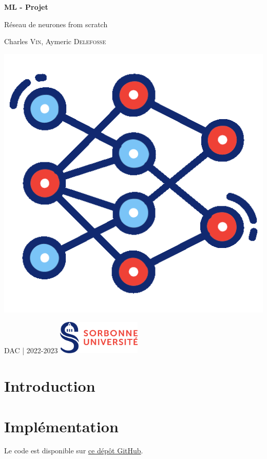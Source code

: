 \documentclass{article}
\begin{document}
\begin{titlepage}
    \begin{center}
        \vspace*{1cm}

        \Huge
        \textbf{ML - Projet}

        \LARGE
        Réseau de neurones from scratch

        \Large
        Charles \textsc{Vin}, Aymeric \textsc{Delefosse}

        \vfill
        \includegraphics[width=.5\textwidth]{neural-network.png}    
        \vfill

        \large
        DAC | 2022-2023 \hfill 
        \includegraphics[width=0.30\textwidth]{logo.png}
        \hfill
        
        
    \end{center}
\end{titlepage}

\tableofcontents
\newpage

\section{Introduction}

\section{Implémentation}

Le code est disponible sur \href{https://github.com/dataymeric/NeuralNetworksDIY}{ce dépôt GitHub}.
\end{document}
